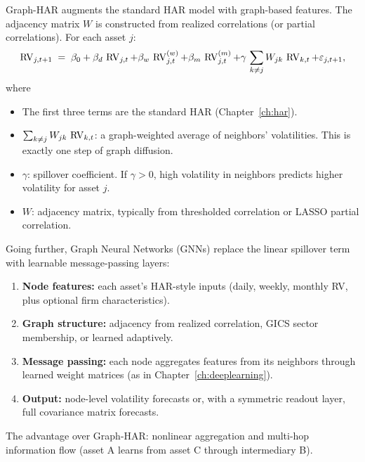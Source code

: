 \begin{keyidea}
Graph-HAR augments the standard HAR model with graph-based features. The
adjacency matrix $W$ is constructed from realized correlations (or partial
correlations). For each asset $j$:
\begin{equation}\label{eq:graph-har}
  \operatorname{RV}_{j,t+1} \;=\; \beta_0 + \beta_d\,\operatorname{RV}_{j,t}
  + \beta_w\,\operatorname{RV}_{j,t}^{(w)}
  + \beta_m\,\operatorname{RV}_{j,t}^{(m)}
  + \gamma\, \sum_{k \neq j} W_{jk}\,\operatorname{RV}_{k,t}
  + \varepsilon_{j,t+1},
\end{equation}
where
\begin{itemize}[nosep]
  \item The first three terms are the standard HAR (Chapter~\ref{ch:har}).
  \item $\sum_{k \neq j} W_{jk}\,\operatorname{RV}_{k,t}$: a graph-weighted average of
        neighbors' volatilities. This is exactly one step of graph diffusion.
  \item $\gamma$: spillover coefficient. If $\gamma > 0$, high volatility in
        neighbors predicts higher volatility for asset $j$.
  \item $W$: adjacency matrix, typically from thresholded correlation or LASSO
        partial correlation.
\end{itemize}
\end{keyidea}

\begin{keyidea}
Going further, Graph Neural Networks (GNNs) replace the linear spillover term
with learnable message-passing layers:
\begin{enumerate}[nosep]
  \item \textbf{Node features:} each asset's HAR-style inputs (daily, weekly,
        monthly RV, plus optional firm characteristics).
  \item \textbf{Graph structure:} adjacency from realized correlation, GICS
        sector membership, or learned adaptively.
  \item \textbf{Message passing:} each node aggregates features from its
        neighbors through learned weight matrices (as in Chapter~\ref{ch:deeplearning}).
  \item \textbf{Output:} node-level volatility forecasts or, with a symmetric
        readout layer, full covariance matrix forecasts.
\end{enumerate}
The advantage over Graph-HAR: nonlinear aggregation and multi-hop
information flow (asset A learns from asset C through intermediary B).
\end{keyidea}

